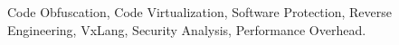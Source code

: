 \begin{IEEEkeywords}
Code Obfuscation, Code Virtualization, Software Protection, Reverse Engineering, VxLang, Security Analysis, Performance Overhead.
\end{IEEEkeywords}
